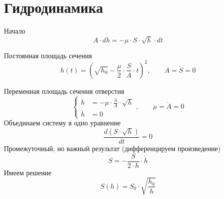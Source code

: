 \section{Гидродинамика}

Начало
\begin{equation*}
  A \cdot dh = - \mu \cdot S \cdot \sqrt{h} \cdot dt
\end{equation*}

Постоянная площадь сечения
\begin{equation*}
  h\left( t \right)
  = \left( \sqrt{h_0}
    - \frac{\mu}{2} \cdot \frac{S}{A} \cdot t \right)^2,
  \qquad  \dot{A} = \dot{S} = 0
\end{equation*}

Переменная площадь сечения отверстия
\begin{equation}\label{eq:hydrodynamics:varSquare}
  \begin{cases}
    \dot{h}  &= - \mu \cdot \frac{S}{A} \cdot \sqrt{h} \\
    \ddot{h} &= 0
  \end{cases},
  \qquad \dot{\mu} = \dot{A} = 0
\end{equation}
Объединаем систему в одно уравнение
\begin{equation*}
  \frac{d\left( S \cdot \sqrt{h} \right)}{dt}
  = 0
\end{equation*}
Промежуточный, но важный результат (дифференцируем произведение)
\begin{equation}\label{eq:hydrodynamics:valuableResult}
  \dot{S}
  = - \frac{S}{2 \cdot h}
    \cdot \dot{h}
\end{equation}
Имеем решение
\begin{equation}\label{eq:hydrodynamics:varSolutionSh}
  S\left( h \right) = S_0 \cdot \sqrt{\frac{h_0}{h}}
\end{equation}

